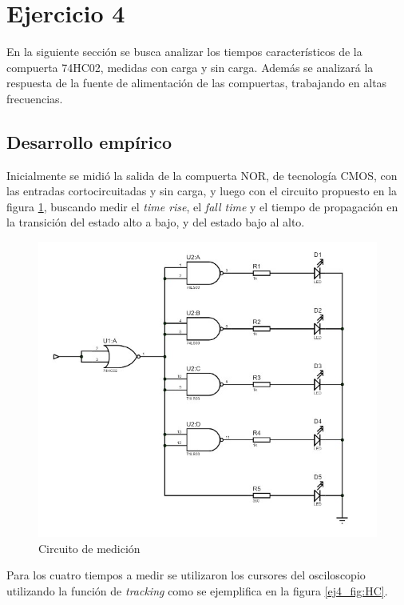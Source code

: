 \section{Ejercicio 4}
\noindent
En la siguiente secci\'on se busca analizar los tiempos caracter\'isticos de la compuerta 74HC02, medidas con carga y sin carga. Adem\'as se analizar\'a la respuesta de la fuente de alimentaci\'on de las compuertas, trabajando en altas frecuencias.
\subsection{Desarrollo emp\'irico}
\noindent
Inicialmente se midi\'o la salida de la compuerta NOR, de tecnolog\'ia CMOS, con las entradas cortocircuitadas y sin carga, y luego con el circuito propuesto en la figura \ref{ej4_fig:circuito}, buscando medir el \textit{time rise}, el \textit{fall time} y el tiempo de propagaci\'on en la transici\'on del estado alto a bajo, y del estado bajo al alto.\\
\begin{figure}[H]
    \centering
    \includegraphics[width=0.5\linewidth]{figs/EJ4/esquematico.jpg}
    \caption{Circuito de medici\'on}
    \label{ej4_fig:circuito}
\end{figure}
Para los cuatro tiempos a medir se utilizaron los cursores del osciloscopio utilizando la funci\'on de \textit{tracking} como se ejemplifica en la figura \ref{ej4_fig:HC}.
